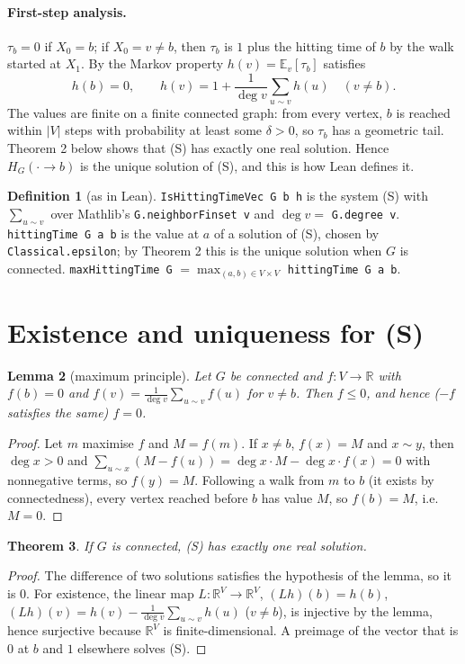 \documentclass[11pt]{article}
\newtheorem{theorem}{Theorem}
\newtheorem{lemma}[theorem]{Lemma}
\theoremstyle{definition}
\newtheorem{definition}[theorem]{Definition}
\begin{document}
\paragraph{First-step analysis.} $\tau_b=0$ if $X_0=b$; if $X_0=v\ne b$, then $\tau_b$ is $1$ plus
the hitting time of $b$ by the walk started at $X_1$. By the Markov property $h(v)=\mathbb
E_v[\tau_b]$ satisfies
\[ h(b)=0,\qquad h(v)=1+\frac{1}{\deg v}\sum_{u\sim v}h(u)\quad(v\ne b). \tag{S}\]
The values are finite on a finite connected graph: from every vertex, $b$ is reached within $|V|$
steps with probability at least some $\delta>0$, so $\tau_b$ has a geometric tail. Theorem 2 below
shows that (S) has exactly one real solution. Hence $H_G(\cdot\to b)$ is the unique solution of
(S), and this is how Lean defines it.

\begin{definition}[as in Lean]
\texttt{IsHittingTimeVec G b h} is the system (S) with
$\sum_{u\sim v}$ over Mathlib's \texttt{G.neighborFinset v} and $\deg v=$ \texttt{G.degree v}.
\texttt{hittingTime G a b} is the value at $a$ of a solution of (S), chosen by
\texttt{Classical.epsilon}; by Theorem 2 this is the unique solution when $G$ is connected.
\texttt{maxHittingTime G} $=\max_{(a,b)\in V\times V}$ \texttt{hittingTime G a b}.
\end{definition}

\section{Existence and uniqueness for (S)}
\begin{lemma}[maximum principle]
Let $G$ be connected and $f:V\to\mathbb R$ with $f(b)=0$ and
$f(v)=\frac1{\deg v}\sum_{u\sim v}f(u)$ for $v\ne b$. Then $f\le0$, and hence ($-f$ satisfies the
same) $f=0$.
\end{lemma}
\begin{proof}
Let $m$ maximise $f$ and $M=f(m)$. If $x\ne b$, $f(x)=M$ and $x\sim y$, then $\deg x>0$ and
$\sum_{u\sim x}(M-f(u))=\deg x\cdot M-\deg x\cdot f(x)=0$ with nonnegative terms, so $f(y)=M$.
Following a walk from $m$ to $b$ (it exists by connectedness), every vertex reached before $b$ has
value $M$, so $f(b)=M$, i.e.\ $M=0$.
\end{proof}
\begin{theorem}
If $G$ is connected, (S) has exactly one real solution.
\end{theorem}
\begin{proof}
The difference of two solutions satisfies the hypothesis of the lemma, so it is $0$. For
existence, the linear map $L:\mathbb R^V\to\mathbb R^V$, $(Lh)(b)=h(b)$,
$(Lh)(v)=h(v)-\frac1{\deg v}\sum_{u\sim v}h(u)$ ($v\neq b$), is injective by the lemma, hence
surjective because $\mathbb R^V$ is finite-dimensional. A preimage of the vector that is $0$ at
$b$ and $1$ elsewhere solves (S).
\end{proof}
\end{document}
